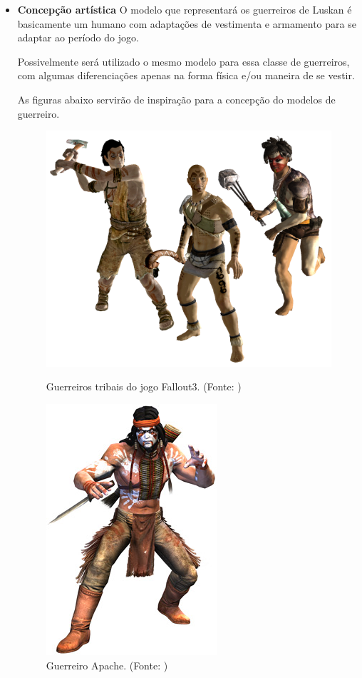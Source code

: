 \begin{itemize}
\item{\bf Concepção artística}
O modelo que representará os guerreiros de Luskan é basicamente um humano com adaptações de vestimenta e armamento para se adaptar ao período do jogo.

Possivelmente será utilizado o mesmo modelo para essa classe de guerreiros, com algumas diferenciações apenas na forma física e/ou maneira de se vestir.

As figuras abaixo servirão de inspiração para a concepção do modelos de guerreiro.
\newpage
 \begin{figure}[H]
 \centering
 \includegraphics[scale=0.5]{Imagens/guerreiro01.png}
 \caption{Guerreiros tribais do jogo Fallout3. (Fonte:  \cite{bib:guerreiro01})}
\label{img:guerreiro01}
 \centering
 \includegraphics[scale=0.5]{Imagens/guerreiro02.png}
 \caption{Guerreiro Apache. (Fonte: \cite{bib:guerreiro02})}
\end{figure}
\end{itemize}

